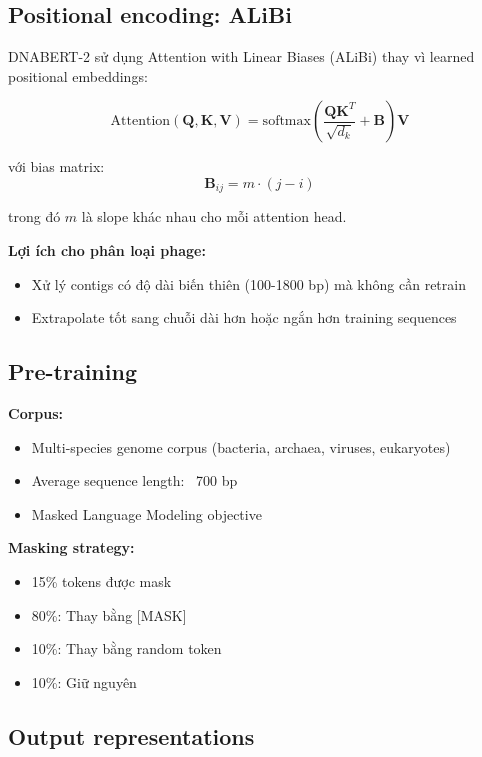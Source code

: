 \subsection{Positional encoding: ALiBi}

DNABERT-2 sử dụng Attention with Linear Biases (ALiBi) \cite{press2021train} thay vì learned positional embeddings:

\begin{equation}
\text{Attention}(\mathbf{Q}, \mathbf{K}, \mathbf{V}) = \text{softmax}\left(\frac{\mathbf{Q}\mathbf{K}^T}{\sqrt{d_k}} + \mathbf{B}\right)\mathbf{V}
\end{equation}

với bias matrix:
\begin{equation}
\mathbf{B}_{ij} = m \cdot (j - i)
\end{equation}

trong đó $m$ là slope khác nhau cho mỗi attention head.

\textbf{Lợi ích cho phân loại phage:}
\begin{itemize}
    \item Xử lý contigs có độ dài biến thiên (100-1800 bp) mà không cần retrain
    \item Extrapolate tốt sang chuỗi dài hơn hoặc ngắn hơn training sequences
\end{itemize}

\subsection{Pre-training}

\textbf{Corpus:}
\begin{itemize}
    \item Multi-species genome corpus (bacteria, archaea, viruses, eukaryotes)
    \item Average sequence length: ~700 bp
    \item Masked Language Modeling objective
\end{itemize}

\textbf{Masking strategy:}
\begin{itemize}
    \item 15\% tokens được mask
    \item 80\%: Thay bằng [MASK]
    \item 10\%: Thay bằng random token
    \item 10\%: Giữ nguyên
\end{itemize}

\subsection{Output representations}

